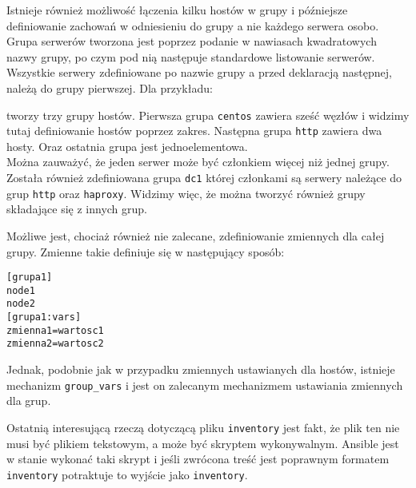 Istnieje również możliwość łączenia kilku hostów w grupy i późniejsze definiowanie zachowań w odniesieniu do grupy a nie każdego serwera osobo.
Grupa serwerów tworzona jest poprzez podanie w nawiasach kwadratowych nazwy grupy, po czym pod nią następuje standardowe listowanie serwerów.
Wszystkie serwery zdefiniowane po nazwie grupy a przed deklaracją następnej, należą do grupy pierwszej.
Dla przykładu:

tworzy trzy grupy hostów.
Pierwsza grupa \texttt{centos} zawiera sześć węzłów i widzimy tutaj definiowanie hostów poprzez zakres.
Następna grupa \texttt{http} zawiera dwa hosty.
Oraz ostatnia grupa jest jednoelementowa.\\
Można zauważyć, że jeden serwer może być członkiem więcej niż jednej grupy.\\
Została również zdefiniowana grupa \texttt{dc1} której członkami są serwery należące do grup \texttt{http} oraz \texttt{haproxy}.
Widzimy więc, że można tworzyć również grupy składające się z innych grup.

Możliwe jest, chociaż również nie zalecane, zdefiniowanie zmiennych dla całej grupy.
Zmienne takie definiuje się w następujący sposób:
\begin{lstlisting}
[grupa1]
node1
node2
[grupa1:vars]
zmienna1=wartosc1
zmienna2=wartosc2
\end{lstlisting}
Jednak, podobnie jak w przypadku zmiennych ustawianych dla hostów, istnieje mechanizm \texttt{group\_vars} i jest on zalecanym mechanizmem ustawiania zmiennych dla grup.

Ostatnią interesującą rzeczą dotyczącą pliku \texttt{inventory} jest fakt, że plik ten nie musi być plikiem tekstowym, a może być skryptem wykonywalnym.
Ansible jest w stanie wykonać taki skrypt i jeśli zwrócona treść jest poprawnym formatem \texttt{inventory} potraktuje to wyjście jako \texttt{inventory}.
